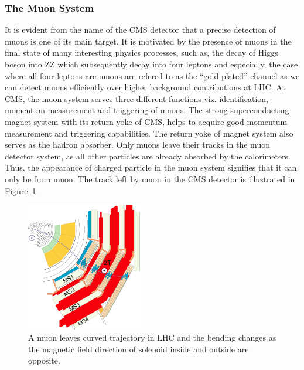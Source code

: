 {{{%


\subsubsection{The Muon System} %
\label{sub:the_muon_system}
It is evident  from the name of the CMS detector that a precise detection of muons is one of its main target. It is motivated by the presence of muons in the final state of many interesting physics processes, such as, the decay of Higgs boson into ZZ which subsequently decay into four leptons and especially, the case where all four leptons are muons are refered to as the ``gold plated'' channel as we can detect muons efficiently over higher background contributions at LHC. At CMS, the muon system serves three different functions viz. identification, momentum measurement and triggering of muons. The strong superconducting magnet system with its return yoke of CMS, helps to acquire good momentum measurement and triggering capabilities. The return yoke of magnet system also serves as the hadron absorber. Only muons leave their tracks in the muon detector system, as all other particles are already absorbed by the calorimeters. Thus, the appearance of charged particle in the muon system signifies that it can only be from muon. The track left by muon in the CMS detector is illustrated in Figure~\ref{fig:muon-system-cross}. 
\begin{figure}[!htbp]
	\centering
	\includegraphics[width=0.45\textwidth]{figures/LHC/MuStations.png}
	\caption{A muon leaves curved trajectory in LHC and the bending changes as the magnetic field direction of solenoid inside and outside are opposite.}
	\label{fig:muon-system-cross}

\end{figure}}}}
